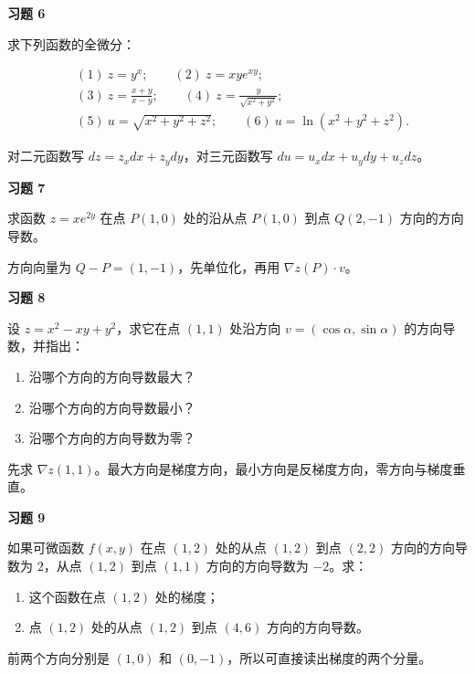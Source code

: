 \begin{exercisebox}
\textbf{习题 6}

求下列函数的全微分：

\[
      \begin{aligned}
      &(1)\ z=y^x; \qquad
      (2)\ z=xye^{xy};\\
      &(3)\ z=\frac{x+y}{x-y}; \qquad
      (4)\ z=\frac{y}{\sqrt{x^2+y^2}};\\
      &(5)\ u=\sqrt{x^2+y^2+z^2}; \qquad
      (6)\ u=\ln(x^2+y^2+z^2).
      \end{aligned}
      \]

\begin{hintbox}
对二元函数写 \(dz=z_xdx+z_ydy\)，对三元函数写 \(du=u_xdx+u_ydy+u_zdz\)。
\end{hintbox}
\end{exercisebox}

\begin{exercisebox}
\textbf{习题 7}

求函数 \(z=xe^{2y}\) 在点 \(P(1,0)\) 处的沿从点 \(P(1,0)\) 到点 \(Q(2,-1)\) 方向的方向导数。

\begin{hintbox}
方向向量为 \(Q-P=(1,-1)\)，先单位化，再用 \(\nabla z(P)\cdot v\)。
\end{hintbox}
\end{exercisebox}

\begin{exercisebox}
\textbf{习题 8}

设 \(z=x^2-xy+y^2\)，求它在点 \((1,1)\) 处沿方向 \(v=(\cos\alpha,\sin\alpha)\) 的方向导数，并指出：

\begin{enumerate}
 \item 沿哪个方向的方向导数最大？
 \item 沿哪个方向的方向导数最小？
 \item 沿哪个方向的方向导数为零？
 \end{enumerate}

\begin{hintbox}
先求 \(\nabla z(1,1)\)。最大方向是梯度方向，最小方向是反梯度方向，零方向与梯度垂直。
\end{hintbox}
\end{exercisebox}

\begin{exercisebox}
\textbf{习题 9}

如果可微函数 \(f(x,y)\) 在点 \((1,2)\) 处的从点 \((1,2)\) 到点 \((2,2)\) 方向的方向导数为 \(2\)，从点 \((1,2)\) 到点 \((1,1)\) 方向的方向导数为 \(-2\)。求：

\begin{enumerate}
 \item 这个函数在点 \((1,2)\) 处的梯度；
 \item 点 \((1,2)\) 处的从点 \((1,2)\) 到点 \((4,6)\) 方向的方向导数。
 \end{enumerate}

\begin{hintbox}
前两个方向分别是 \((1,0)\) 和 \((0,-1)\)，所以可直接读出梯度的两个分量。
\end{hintbox}
\end{exercisebox}

